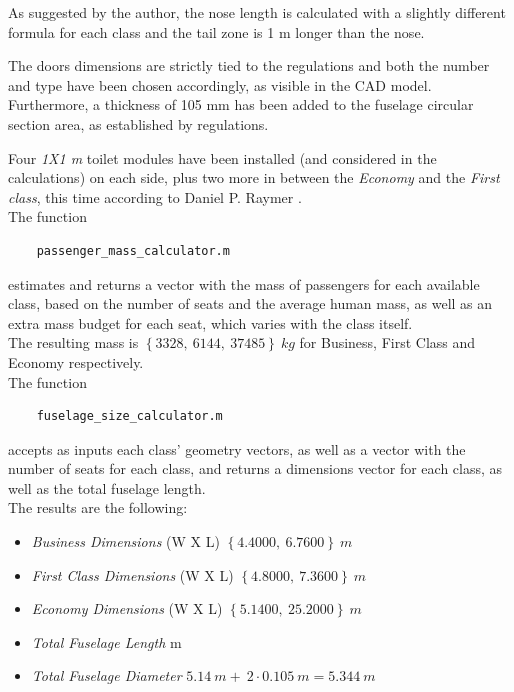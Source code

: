 \documentclass{article}
\begin{document}
As suggested by the author, the nose length is calculated with a slightly different
formula for each class and the tail zone is 1 m longer than the nose. 

The doors dimensions are strictly tied to the regulations and both the number and type have been 
chosen accordingly, as visible in the CAD model. 
Furthermore, a thickness of 105 mm has been added to the fuselage circular section area, as established by regulations. 

Four \textit{1X1 m} toilet modules have been installed (and considered in the calculations) on each side, plus two more in between the 
\textit{Economy} and the \textit{First class}, this time according to Daniel P. Raymer \autocite{Raymer_Daniel}.\\ 

The function \autocite{Airbus_replacement_repo}
\begin{verbatim}
    passenger_mass_calculator.m
\end{verbatim}

estimates and returns a vector with the mass of passengers for each available class, based on the number of seats and
the average human mass, as well as an extra mass budget for each seat, which varies with the class itself.\\ 

The resulting mass is $\left \{ 3328,  \  6144, \  37485 \right \} \ kg$ for Business, First Class and Economy respectively. \\ 

The function 
\begin{verbatim}
    fuselage_size_calculator.m
\end{verbatim}

accepts as inputs each class' geometry vectors, as well as a vector with the number of seats for each class, 
and returns a dimensions vector for each class, as well as the total fuselage length. \\ 

The results are the following:
\begin{itemize}
    \item \textit{Business Dimensions} (W X L)
        \subitem  $\left \{4.4000, \ 6.7600 \right \} \ m$
    \item \textit{First Class Dimensions} (W X L)
        \subitem  $\left \{4.8000, \ 7.3600 \right \} \ m$
    \item \textit{Economy Dimensions} (W X L)
        \subitem  $\left \{5.1400, \ 25.2000 \right \} \ m$
    \item \textit{Total Fuselage Length}
         m
    \item \textit{Total Fuselage Diameter}
        \subitem $5.14 \ m + \ 2 \cdot 0.105 \ m = 5.344 \ m$
\end{itemize}
\end{document}
